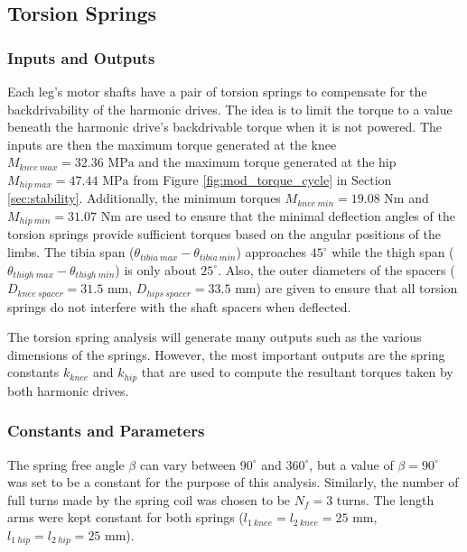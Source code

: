\subsection{Torsion Springs} \label{subsec:Tspring}

\subsubsection{Inputs and Outputs}
Each leg's motor shafts have a pair of torsion springs to compensate for the backdrivability of the harmonic drives. The idea is to limit the torque to a value beneath the harmonic drive's backdrivable torque when it is not powered. The inputs are then the maximum torque generated at the knee $M_{knee\ max} = 32.36\text{ MPa}$ and the maximum torque generated at the hip $M_{hip\ max} = 47.44\text{ MPa}$ from Figure \ref{fig:mod_torque_cycle} in Section \ref{sec:stability}. Additionally, the minimum torques $M_{knee\ min} = 19.08\text{ Nm}$ and $M_{hip\ min} = 31.07\text{ Nm}$ are used to ensure that the minimal deflection angles of the torsion springs provide sufficient torques based on the angular positions of the limbs. The tibia span ($\theta_{tibia\ max}-\theta_{tibia\ min}$) approaches $45^{\circ}$ while the thigh span ($\theta_{thigh\ max}-\theta_{thigh\ min}$) is only about $25^{\circ}$. Also, the outer diameters of the spacers ($D_{knee\ spacer} = 31.5\text{ mm}$, $D_{hips\ spacer} = 33.5\text{ mm}$) are given to ensure that all torsion springs do not interfere with the shaft spacers when deflected.

The torsion spring analysis will generate many outputs such as the various dimensions of the springs. However, the most important outputs are the spring constants $k_{knee}$ and $k_{hip}$ that are used to compute the resultant torques taken by both harmonic drives.
\subsubsection{Constants and Parameters}
The spring free angle $\beta$ can vary between $90^{\circ}$ and $360^{\circ}$, but a value of $\beta = 90^{\circ}$ was set to be a constant for the purpose of this analysis. Similarly, the number of full turns made by the spring coil was chosen to be $N_f = 3$ turns. The length arms were kept constant for both springs ($l_{1\ knee} = l_{2\ knee} = 25\text{ mm}$, $l_{1\ hip} = l_{2\ hip} = 25\text{ mm}$).
